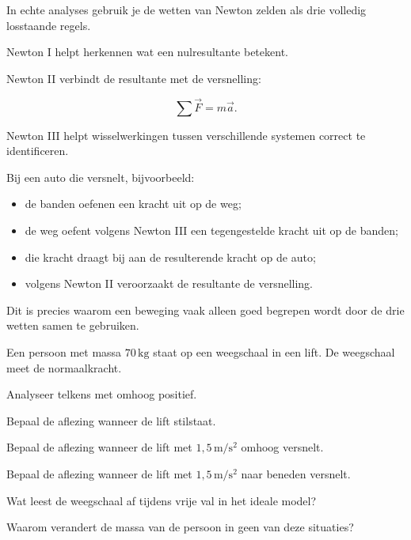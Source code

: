 \documentclass{ximera}
\begin{document}

In echte analyses gebruik je de wetten van Newton zelden als drie
volledig losstaande regels.

Newton I helpt herkennen wat een nulresultante betekent.

Newton II verbindt de resultante met de versnelling:

\[
\sum\vec F=m\vec a.
\]

Newton III helpt wisselwerkingen tussen verschillende systemen correct
te identificeren.

Bij een auto die versnelt, bijvoorbeeld:

\begin{itemize}
  \item de banden oefenen een kracht uit op de weg;
  \item de weg oefent volgens Newton III een tegengestelde kracht uit op
        de banden;
  \item die kracht draagt bij aan de resulterende kracht op de auto;
  \item volgens Newton II veroorzaakt de resultante de versnelling.
\end{itemize}

Dit is precies waarom een beweging vaak alleen goed begrepen wordt door
de drie wetten samen te gebruiken.


\begin{oefening}[Liftanalyse]{\oefU\ESS}

Een persoon met massa $70\,\mathrm{kg}$ staat op een weegschaal in een
lift. De weegschaal meet de normaalkracht.

Analyseer telkens met omhoog positief.

\begin{question}
Bepaal de aflezing wanneer de lift stilstaat.
\end{question}

\begin{question}
Bepaal de aflezing wanneer de lift met
$1,5\,\mathrm{m/s^2}$ omhoog versnelt.
\end{question}

\begin{question}
Bepaal de aflezing wanneer de lift met
$1,5\,\mathrm{m/s^2}$ naar beneden versnelt.
\end{question}

\begin{question}
Wat leest de weegschaal af tijdens vrije val in het ideale model?
\end{question}

\begin{question}
Waarom verandert de massa van de persoon in geen van deze situaties?
\end{question}

\end{oefening}
\end{document}
